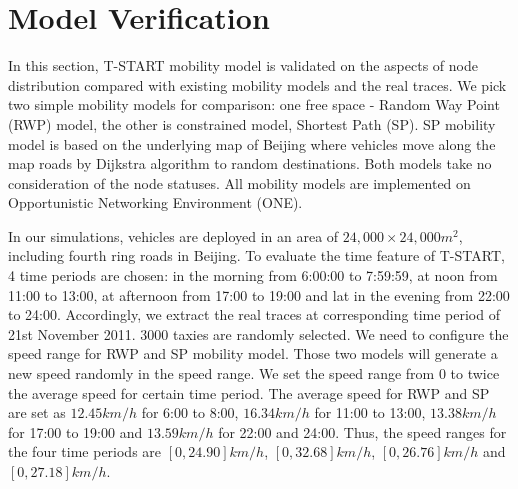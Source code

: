 \section{Model Verification}
\label{section_model_varification}

In this section, T-START mobility model is validated on the aspects of node distribution compared with existing mobility models and the real traces. We pick two simple mobility models for comparison: one free space - Random Way Point (RWP) model, the other is constrained model, Shortest Path (SP).  SP mobility model is based on the underlying map of Beijing where vehicles move along the map roads by Dijkstra algorithm to random destinations. Both models take no consideration of the node statuses. All mobility models are implemented on Opportunistic Networking Environment (ONE)\cite{KeranenOtt-155}.

In our simulations, vehicles are deployed in an area of $24,000\times 24,000 m^2$, including fourth ring roads in Beijing.
To evaluate the time feature of T-START, 4 time periods are chosen: in the morning from 6:00:00 to 7:59:59, at noon from 11:00 to 13:00, at afternoon from 17:00 to 19:00 and lat in the evening from 22:00 to 24:00. Accordingly, we extract the real traces at corresponding time period of 21st November 2011.
3000 taxies are randomly selected. 
We need to configure the speed range for RWP and SP mobility model. Those two models will generate a new speed randomly in the speed range. We set the speed range from 0 to twice the average speed for certain time period.
The average speed for RWP and SP are set as $12.45 km/h$ for 6:00 to 8:00, $16.34km/h$ for 11:00 to 13:00, $13.38km/h$ for 17:00 to 19:00 and $13.59 km/h$ for 22:00 and 24:00. 
Thus, the speed ranges for the four time periods are $[0, 24.90]km/h$, $[0, 32.68]km/h$, $[0, 26.76]km/h$ and $[0, 27.18]km/h$.


